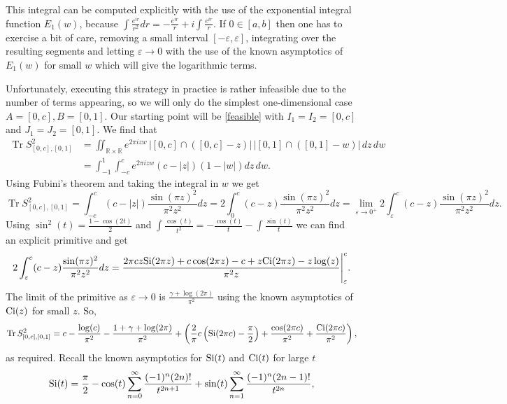 \documentclass[12pt]{amsart}
\numberwithin{equation}{section}
\newcommand{\R}{\mathbb{R}}
\newcommand{\eps}{\varepsilon}
\begin{document}
This integral can be computed explicitly with the use of the exponential integral function $E_1(w)$, because $\int \frac{e^{ir}}{r^2}dr = -\frac{e^{ir}}{r} + i\int \frac{e^{ir}}{r}$. If $0\in [a, b]$ then one has to exercise a bit of care, removing a small interval $[-\eps, \eps]$, integrating over the resulting segments and letting $\eps \to 0$ with the use of the known asymptotics of $E_1(w)$ for small $w$ which will give the logarithmic terms.

Unfortunately, executing this strategy in practice is rather infeasible due to the number of terms appearing, so we will only do the simplest one-dimensional case $A = [0, c], B = [0,1]$. Our starting point will be \eqref{feasible} with $I_1 = I_2 = [0,c]$ and $J_1 = J_2 = [0,1]$. We find that
\begin{align*}
\operatorname{Tr} S_{[0,c],[0,1]}^2 &= \iint_{\R\times\R} e^{2\pi i zw}\,\left|[0,c]\cap ([0,c]-z)\right|\,\left|[0,1]\cap ([0,1]-w)\right| \,dz\, dw\\
& = \int_{-1}^1 \int_{-c}^c  e^{2\pi i z w} \left( c - |z|\right) \left( 1 - |w|\right) dz \, dw.
\end{align*}
Using Fubini's theorem and taking the integral in $w$ we get
$$\operatorname{Tr} S_{[0,c],[0,1]}^2 = \int_{-c}^c (c-|z|)\frac{\sin(\pi z)^2}{\pi^2 z^2}dz = 2\int_0^c (c-z)\frac{\sin(\pi z)^2}{\pi^2z^2}dz = \lim_{\eps \to 0^+} 2\int_\eps^c (c-z)\frac{\sin(\pi z)^2}{\pi^2z^2}dz. $$
Using $\sin^2(t) = \frac{1-\cos(2t)}{2}$ and $\int \frac{\cos(t)}{t^2} = -\frac{\cos(t)}{t} - \int \frac{\sin(t)}{t}$ we can find an explicit primitive and get
$$2\int_\eps^c (c-z)\frac{\sin(\pi z)^2}{\pi^2z^2}dz = \frac{2\pi cz                 {\rm Si}(2\pi z)+c\cos(2\pi z)-c+z{\rm Ci}(2\pi z)-z\log(z)}{\pi^2 z} \Bigg \rvert_\eps^c.$$
The limit of the primitive as $\eps \to 0$ is $\frac{\gamma + \log(2\pi)}{\pi^2}$ using the known asymptotics of ${\rm Ci}(z)$ for small $z$. So, 
$$\operatorname{Tr} S_{[0,c],[0,1]}^2 = c - \frac{\log(c)}{\pi^2} - \frac{1+\gamma + \log(2\pi)}{\pi^2} + \left(\frac{2}{\pi} c\left({\rm Si}(2\pi c)-\frac{\pi}{2}\right) + \frac{\cos(2\pi c)}{\pi^2} + \frac{{\rm Ci}(2\pi c)}{\pi^2}\right),$$
as required. Recall the known asymptotics for ${\rm Si}(t)$ and ${\rm Ci}(t)$ for large $t$
\begin{equation}\label{Si asymp}
{\rm Si}(t) = \frac{\pi}{2} - \cos(t) \sum_{n=0}^\infty \frac{(-1)^n (2n)!}{t^{2n+1}}+ \sin(t) \sum_{n=1}^\infty \frac{(-1)^n(2n-1)!}{t^{2n}},
\end{equation}
\end{document}
